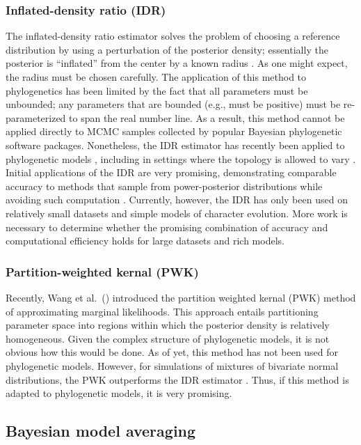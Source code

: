 \subsubsection{Inflated-density ratio (IDR)}
The inflated-density ratio estimator solves the problem of choosing a
reference distribution by using a perturbation of the posterior density;
essentially the posterior is ``inflated'' from the center by a known radius
\citep{Petris2007,Arima2012,Arima2014}.
As one might expect, the radius must be chosen carefully.
The application of this method to phylogenetics has been limited by the fact
that all parameters must be unbounded; any parameters that are bounded (e.g.,
must be positive) must be re-parameterized to span the real number line.
As a result, this method cannot be applied directly to MCMC samples collected
by popular Bayesian phylogenetic software packages.
Nonetheless, the IDR estimator has recently been applied to phylogenetic models
\citep{Arima2014}, including in settings where the topology is allowed to vary
\citep{Wu2014}.
Initial applications of the IDR are very promising, demonstrating comparable
accuracy to methods that sample from power-posterior distributions while
avoiding such computation \citep{Arima2014,Wu2014}.
Currently, however, the IDR has only been used on relatively small datasets and
simple models of character evolution.
More work is necessary to determine whether the promising combination of
accuracy and computational efficiency holds for large datasets and rich models.

\subsubsection{Partition-weighted kernal (PWK)}
Recently, Wang et al.\ (\citeyear{Wang2017}) introduced the partition weighted
kernal (PWK) method of approximating marginal likelihoods.
This approach entails partitioning parameter space into regions within which
the posterior density is relatively homogeneous.
Given the complex structure of phylogenetic models, it is not obvious how this
would be done.
As of yet, this method has not been used for phylogenetic models.
However, for simulations of mixtures of bivariate normal distributions, the
PWK outperforms the IDR estimator \citep{Wang2017}.
Thus, if this method is adapted to phylogenetic models, it is very promising.


\subsection{Bayesian model averaging}

